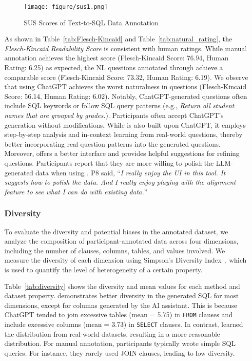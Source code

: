 \begin{figure*}[htb]
  \centering
  \texttt{[image: figure/sus1.png]}
  \caption{SUS Scores of Text-to-SQL Data Annotation}
  \label{fig:sus1}
\end{figure*}



As shown in Table~\ref{tab:Flesch-Kincaid} and Table~\ref{tab:natural_rating}, the \textit{Flesch-Kincaid Readability Score} is consistent with human ratings. While manual annotation achieves the highest score (Flesch-Kincaid Score: 76.94, Human Rating: 6.25) as expected, the NL questions annotated through {\tool} achieve a comparable score (Flesch-Kincaid Score: 73.32, Human Rating: 6.19). We observe that using ChatGPT achieves the worst naturalness in questions (Flesch-Kincaid Score: 56.14, Human Rating: 6.02). Notably, ChatGPT-generated questions often include SQL keywords or follow SQL query patterns (e.g., \textit{Return all student names that are grouped by grades.}). 
Participants often accept ChatGPT's generation without modifications. While {\tool} is also built upon ChatGPT, it employs step-by-step analysis and in-context learning from real-world questions, thereby better incorporating real question patterns into the generated questions. 
Moreover, {\tool} offers a better interface and provides helpful suggestions for refining questions. Participants report that they are more willing to polish the LLM-generated data when using {\tool}.
P8 said, ``\textit{I really enjoy the UI in this tool. It suggests how to polish the data. And I really enjoy playing with the alignment feature to see what I can do with existing data.}''



\subsubsection{\textbf{Diversity}}
To evaluate the diversity and potential biases in the annotated dataset, we analyze the composition of participant-annotated data across four dimensions, including the number of clauses, columns, tables, and values involved. We measure the diversity of each dimension using Simpson's Diversity Index~\cite{simpson_diversity}, which is used to quantify the level of heterogeneity of a certain property.





Table~\ref{tab:diversity} shows the diversity and mean values for each method and dataset property. {\tool} demonstrates better diversity in the generated SQL for most dimensions, except for columns generated by the AI assistant. 
This is because ChatGPT tended to join excessive tables (mean = 5.75) in \texttt{FROM} clauses and include excessive columns (mean = 3.73) in  \texttt{SELECT} clauses.
In contrast, {\tool} learned the distribution from real-world datasets, resulting in a more reasonable distribution. For manual annotation, participants typically wrote simple SQL queries. For instance, they rarely used JOIN clauses, leading to low diversity.





